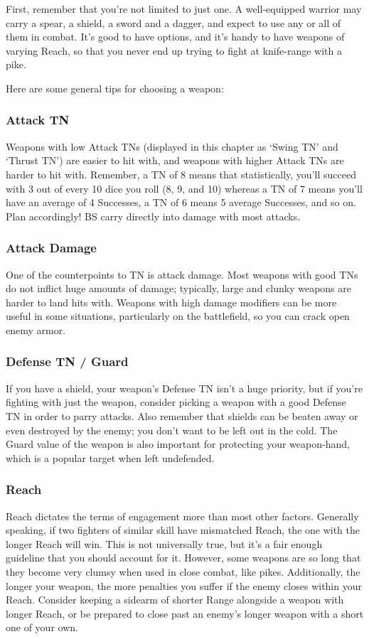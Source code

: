 \documentclass[oneside,11pt,english]{book}
\begin{document}
First, remember that you’re not limited to just one. A well-equipped warrior may carry a spear, a shield, a sword and a dagger, and expect to use any or all of them in combat. It’s good to have options, and it’s handy to have weapons of varying Reach, so that you never end up trying to fight at knife-range with a pike.

Here are some general tips for choosing a weapon:
\subsubsection{Attack TN}
Weapons with low Attack TNs (displayed in this chapter as ‘Swing TN’ and ‘Thrust TN’) are easier to hit with, and 
weapons with higher Attack TNs are harder to hit with. Remember, a TN of 8 means that statistically, you’ll succeed 
with 3 out of every 10 dice you roll (8, 9, and 10) whereas a TN of 7 means you’ll have an average of 4 Successes, a 
TN of 6 means 5 average Successes, and so on. Plan accordingly! BS carry directly into damage with most attacks.
\subsubsection{Attack Damage}
One of the counterpoints to TN is attack damage. Most weapons with good TNs do not inflict huge amounts of 
damage; typically, large and clunky weapons are harder to land hits with. Weapons with high damage modifiers can be
more useful in some situations, particularly on the battlefield, so you can crack open enemy armor.
\subsubsection{Defense TN / Guard}
If you have a shield, your weapon’s Defense TN isn’t a huge priority, but if you’re fighting with just the weapon, 
consider picking a weapon with a good Defense TN in order to parry attacks. Also remember that shields can be 
beaten away or even destroyed by the enemy; you don’t want to be left out in the cold. The Guard value of the weapon
is also important for protecting your weapon-hand, which is a popular target when left undefended.
\subsubsection{Reach}
Reach dictates the terms of engagement more than most other factors. Generally speaking, if two fighters of similar 
skill have mismatched Reach, the one with the longer Reach will win. This is not universally true, but it’s a fair 
enough guideline that you should account for it. However, some weapons are so long that they become very clumsy 
when used in close combat, like pikes. Additionally, the longer your weapon, the more penalties you suffer if the 
enemy closes within your Reach. Consider keeping a sidearm of shorter Range alongside a weapon with longer 
Reach, or be prepared to close past an enemy’s longer weapon with a short one of your own.
\end{document}
